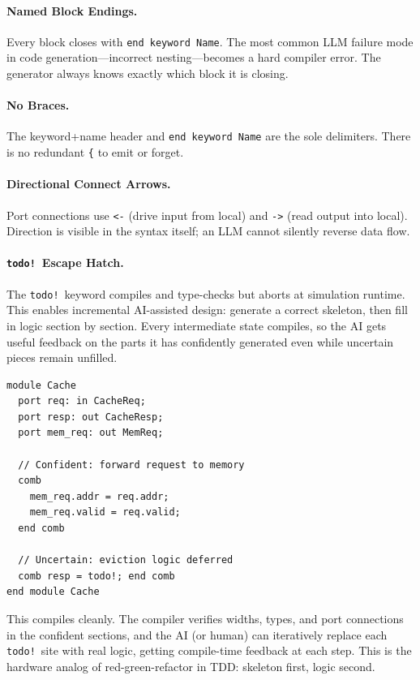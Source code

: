 \documentclass[11pt,twocolumn]{article}
\begin{document}
\paragraph{Named Block Endings.} Every block closes with \texttt{end keyword Name}. The most common LLM failure mode in code generation---incorrect nesting---becomes a hard compiler error. The generator always knows exactly which block it is closing.

\paragraph{No Braces.} The keyword+name header and \texttt{end keyword Name} are the sole delimiters. There is no redundant \texttt{\{} to emit or forget.

\paragraph{Directional Connect Arrows.} Port connections use \texttt{<-} (drive input from local) and \texttt{->} (read output into local). Direction is visible in the syntax itself; an LLM cannot silently reverse data flow.

\paragraph{\texttt{todo!}\ Escape Hatch.} The \texttt{todo!}\ keyword compiles and type-checks but aborts at simulation runtime. This enables incremental AI-assisted design: generate a correct skeleton, then fill in logic section by section. Every intermediate state compiles, so the AI gets useful feedback on the parts it has confidently generated even while uncertain pieces remain unfilled.

\begin{lstlisting}[language=Arch,caption={Partial implementation with \texttt{todo!}},label={lst:todo}]
module Cache
  port req: in CacheReq;
  port resp: out CacheResp;
  port mem_req: out MemReq;

  // Confident: forward request to memory
  comb
    mem_req.addr = req.addr;
    mem_req.valid = req.valid;
  end comb

  // Uncertain: eviction logic deferred
  comb resp = todo!; end comb
end module Cache
\end{lstlisting}

This compiles cleanly. The compiler verifies widths, types, and port connections in the confident sections, and the AI (or human) can iteratively replace each \texttt{todo!}\ site with real logic, getting compile-time feedback at each step. This is the hardware analog of red-green-refactor in TDD: skeleton first, logic second.
\end{document}
